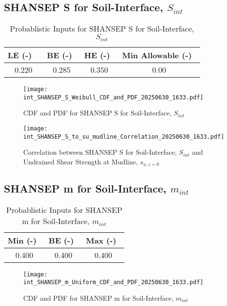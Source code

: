 \documentclass{article}
\begin{document}
\subsection*{SHANSEP S for Soil-Interface, $S_{int}$}
\begin{table}[h!]
\centering
\caption{Probablistic Inputs for SHANSEP S for Soil-Interface, $S_{int}$}
\begin{tabular}{|c|c|c|c|}
\hline
LE (-) \ & BE (-)\ & HE (-)\ & Min Allowable (-)\ \\
\hline
0.220 & 0.285 & 0.350 & 0.00 \\
\hline
\end{tabular}
\end{table}
\begin{figure}[h!]
\centering
\texttt{[image: int\_SHANSEP\_S\_Weibull\_CDF\_and\_PDF\_20250630\_1633.pdf]}
\caption{CDF and PDF for SHANSEP S for Soil-Interface, $S_{int}$}
\end{figure}
\begin{figure}[h!]
\centering
\texttt{[image: int\_SHANSEP\_S\_to\_su\_mudline\_Correlation\_20250630\_1633.pdf]}
\caption{Correlation between SHANSEP S for Soil-Interface, $S_{int}$ and Undrained Shear Strength at Mudline, $s_{{u,z=0}}$}
\end{figure}
\clearpage
\subsection*{SHANSEP m for Soil-Interface, $m_{int}$}
\begin{table}[h!]
\centering
\caption{Probablistic Inputs for SHANSEP m for Soil-Interface, $m_{int}$}
\begin{tabular}{|c|c|c|}
\hline
Min (-)\ & BE (-)\ & Max (-)\ \\
\hline
0.400 & 0.400 & 0.400 \\
\hline
\end{tabular}
\end{table}
\begin{figure}[h!]
\centering
\texttt{[image: int\_SHANSEP\_m\_Uniform\_CDF\_and\_PDF\_20250630\_1633.pdf]}
\caption{CDF and PDF for SHANSEP m for Soil-Interface, $m_{int}$}
\end{figure}
\clearpage
\end{document}
